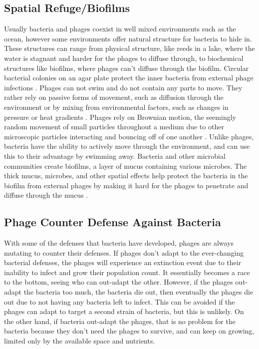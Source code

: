 \subsection{Spatial Refuge/Biofilms} 
Usually bacteria and phages coexist in well mixed environments such as the ocean, however some environments offer natural structure for bacteria to hide in. 
These structures can range from physical structure, like reeds in a lake, where the water is stagnant and harder for the phages to diffuse through, to biochemical structures like biofilms, where phages can't diffuse through the biofilm. \newline
Circular bacterial colonies on an agar plate protect the inner bacteria from external phage infections \cite{eriksenGrowingMicrocolonyCan2018}. 
Phages can not swim and do not contain any parts to move. 
They rather rely on passive forms of movement, such as diffusion through the environment or by mixing from environmental factors, such as changes in pressure or heat gradients \cite{lohrmannInfluenceBacterialSwimming2024}. 
Phages rely on Brownian motion, the seemingly random movement of small particles throughout a medium due to other microscopic particles interacting and bouncing off of one another \cite{moineauBacteriophage2013}. 
Unlike phages, bacteria have the ability to actively move through the environment, and can use this to their advantage by swimming away. 
Bacteria and other microbial communities create biofilms, a layer of mucus containing various microbes. 
The thick mucus, microbes, and other spatial effects help protect the bacteria in the biofilm from external phages by making it hard for the phages to penetrate and diffuse through the mucus \cite{abedonPhageDelayEnhancing2017}. 

\subsection{Phage Counter Defense Against Bacteria}
With some of the defenses that bacteria have developed, phages are always mutating to counter their defenses. 
If phages don't adapt to the ever-changing bacterial defenses, the phages will experience an extinction event due to their inability to infect and grow their population count. 
It essentially becomes a race to the bottom, seeing who can out-adapt the other. 
However, if the phages out-adapt the bacteria too much, the bacteria die out, then eventually the phages die out due to not having any bacteria left to infect. 
This can be avoided if the phages can adapt to target a second strain of bacteria, but this is unlikely. 
On the other hand, if bacteria out-adapt the phages, that is no problem for the bacteria because they don't need the phages to survive, and can keep on growing, limited only by the available space and nutrients. 

